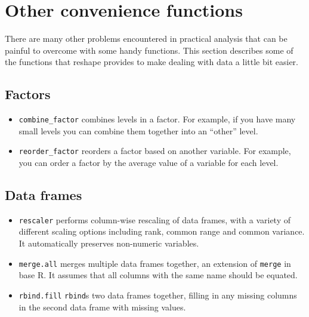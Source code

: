 \documentclass[oneside,letterpaper]{scrartcl}
\begin{document}
%
%

\newpage
\section{Other convenience functions}\label{sec:other_convenience_functions}

There are many other problems encountered in practical analysis that can be painful to overcome with some handy functions.  This section describes some of the functions that reshape provides to make dealing with data a little bit easier.  

\subsection{Factors}\label{sub:factor_related}

\begin{itemize}
	\item {\tt combine\_factor} combines levels in a factor.  For example, if you have many small levels you can combine them together into an ``other'' level.
	\item {\tt reorder\_factor} reorders a factor based on another variable.  For example, you can order a factor by the average value of a variable for each level.
\end{itemize}

\subsection{Data frames}\label{sub:data_related}

\begin{itemize}
	\item {\tt rescaler} performs column-wise rescaling of data frames,  with a variety of different scaling options including rank, common range and common variance.  It automatically preserves non-numeric variables.
	\item {\tt merge.all} merges multiple data frames together, an extension of {\tt merge} in base R.  It assumes that all columns with the same name should be equated.
	\item {\tt rbind.fill} {\tt rbind}s two data frames together, filling in any missing columns in the second data frame with missing values.
\end{itemize}
\end{document}
